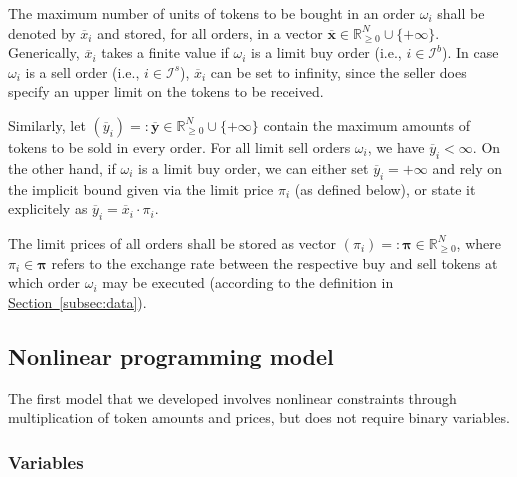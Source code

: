 \documentclass[11pt,parskip=full]{scrartcl}%
\newcommand*{\ie}{i.e., }
\newcommand*{\ibuyorders}{\mathcal{I}^b}    %
\newcommand*{\isellorders}{\mathcal{I}^s}   %
\newcommand*{\subsecref}[1]{\hyperref[{#1}]{Section~\ref*{#1}}}
\begin{document}
The maximum number of units of tokens to be bought in an order $ \omega_i $ shall be denoted by
$ \overline{x}_i $ and stored, for all orders, in a vector
$ \overline{\mathbf{x}} \in \mathbb{R}^N_{\ge 0} \cup \{+\infty\} $.
Generically, $ \overline{x}_i $ takes a finite value if $ \omega_i $ is a limit buy order
(\ie $ i \in \ibuyorders $).
In case $ \omega_i $ is a sell order (\ie $ i \in \isellorders $), $ \overline{x}_i $ can be set to
infinity, since the seller does specify an upper limit on the tokens to be received.

Similarly, let
$ (\overline{y}_i) =: \overline{\mathbf{y}} \in \mathbb{R}^N_{\ge 0} \cup \{+\infty\} $ contain the
maximum amounts of tokens to be sold in every order.
For all limit sell orders $ \omega_i $, we have $ \overline{y}_i < \infty $.
On the other hand, if $ \omega_i $ is a limit buy order, we can either set
$ \overline{y}_i = +\infty $ and rely on the implicit bound given via the limit price $ \pi_i $ (as
defined below), or state it explicitely as $ \overline{y}_i = \overline{x}_i \cdot \pi_i $.

The limit prices of all orders shall be stored as vector $ (\pi_i) =: \bm{\pi} \in \mathbb{R}^N_
{\ge 0} $, where $ \pi_i \in \bm{\pi} $ refers to the exchange rate between the respective buy and
sell tokens at which order $ \omega_i $ may be executed (according to the definition in
\subsecref{subsec:data}).


\subsection{Nonlinear programming model}
\label{subsec:NLPmodel}

The first model that we developed involves nonlinear constraints through multiplication of token
amounts and prices, but does not require binary variables.

\subsubsection*{Variables}
\end{document}
